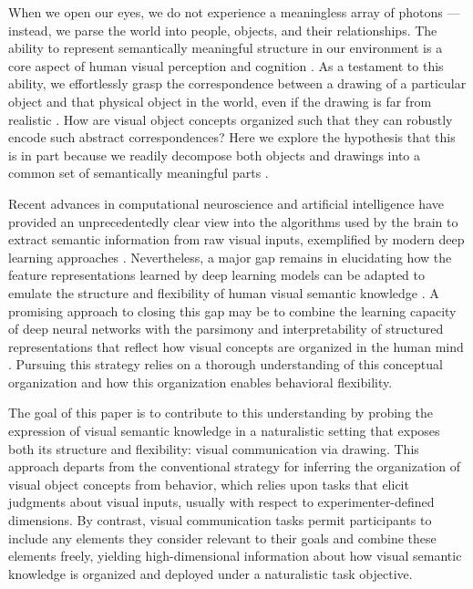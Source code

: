 \documentclass[10pt,letterpaper]{article}
\begin{document}
When we open our eyes, we do not experience a meaningless array of photons --- instead, we parse the world into people, objects, and their relationships. 
The ability to represent semantically meaningful structure in our environment is a core aspect of human visual perception and cognition \cite{navon1977forest}. 
As a testament to this ability, we effortlessly grasp the correspondence between a drawing of a particular object and that physical object in the world, even if the drawing is far from realistic \cite{eitz2012humans,FanCommon2018}. 
How are visual object concepts organized such that they can robustly encode such abstract correspondences?
Here we explore the hypothesis that this is in part because we readily decompose both objects and drawings into a common set of semantically meaningful parts \cite{biederman1988surface}. 

Recent advances in computational neuroscience and artificial intelligence have provided an unprecedentedly clear view into the algorithms used by the brain to extract semantic information from raw visual inputs, exemplified by modern deep learning approaches \cite{yamins2014performance}.
Nevertheless, a major gap remains in elucidating how the feature representations learned by deep learning models can be adapted to emulate the structure and flexibility of human visual semantic knowledge \cite{lake2017building}.
A promising approach to closing this gap may be to combine the learning capacity of deep neural networks with the parsimony and interpretability of structured representations that reflect how visual concepts are organized in the human mind \cite{battaglia2018relational}. 
Pursuing this strategy relies on a thorough understanding of this conceptual organization and how this organization enables behavioral flexibility.  

The goal of this paper is to contribute to this understanding by probing the expression of visual semantic knowledge in a naturalistic setting that exposes both its structure and flexibility: visual communication via drawing.
This approach departs from the conventional strategy for inferring the organization of visual object concepts from behavior, which relies upon tasks that elicit judgments about visual inputs, usually with respect to experimenter-defined dimensions. 
By contrast, visual communication tasks permit participants to include any elements they consider relevant to their goals and combine these elements freely, yielding high-dimensional information about how visual semantic knowledge is organized and deployed under a naturalistic task objective. 
\end{document}
